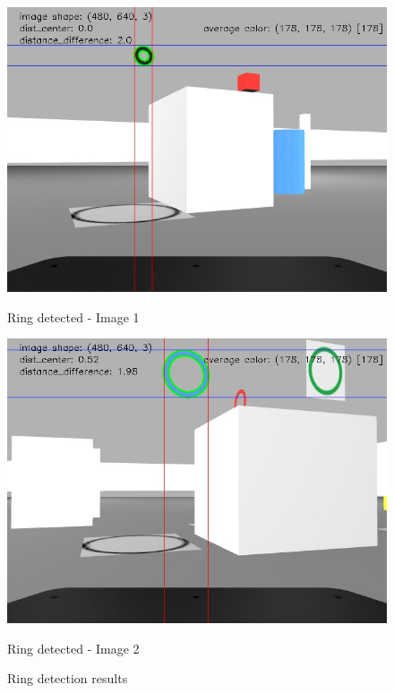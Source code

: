 \documentclass{article}
\begin{document}
\begin{figure}[htbp]
  \centering
  \begin{minipage}[b]{0.45\textwidth}
    \centering
    \includegraphics[width=\textwidth]{images/ring1.jpg}
    \caption{Ring detected - Image 1}
    \label{fig:ring1}
  \end{minipage}%
  \hfill
  \begin{minipage}[b]{0.45\textwidth}
    \centering
    \includegraphics[width=\textwidth]{images/ring2.jpg}
    \caption{Ring detected - Image 2}
    \label{fig:ring2}
  \end{minipage}
  \caption{Ring detection results}
  \label{fig:rings}
\end{figure}
\end{document}
